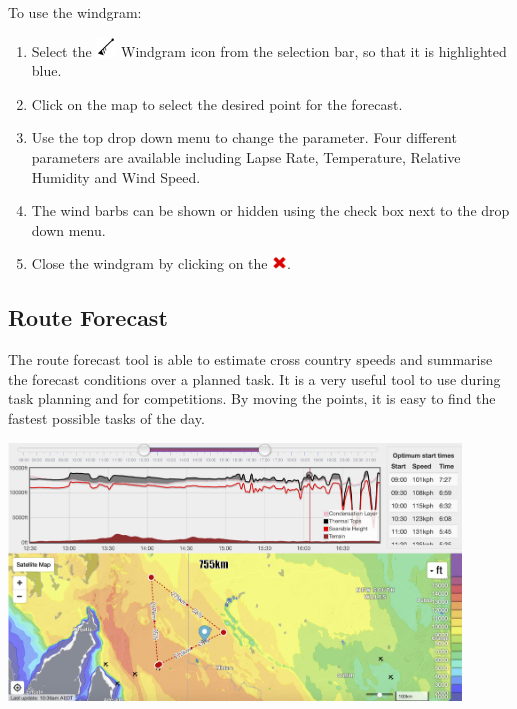 \documentclass[11pt,a4paper]{article}
\begin{document}
To use the windgram:
\begin{enumerate}
\item Select the \includegraphics[height=15pt]{images/icons/windgram.png} Windgram icon from the selection bar, so that it is highlighted blue.
\item Click on the map to select the desired point for the forecast.
\item Use the top drop down menu to change the parameter. Four different parameters are available including Lapse Rate, Temperature, Relative Humidity and Wind Speed.
\item The wind barbs can be shown or hidden using the check box next to the drop down menu.
\item Close the windgram by clicking on the \includegraphics[height=11pt]{images/icons/exit.png}.
\end{enumerate}

\subsection{Route Forecast}
The route forecast tool is able to estimate cross country speeds and summarise the forecast conditions over a planned task. It is a very useful tool to use during task planning and for competitions. By moving the points, it is easy to find the fastest possible tasks of the day.
\begin{center}
\includegraphics[width=12cm]{images/route.png}
\end{center}
\end{document}
